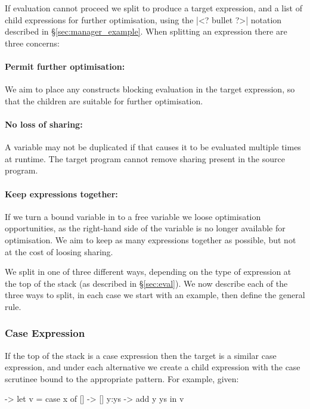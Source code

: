 \documentclass[draft]{sigplanconf}
\begin{document}
If evaluation cannot proceed we split to produce a target expression, and a list of child expressions for further optimisation, using the |<? bullet ?>| notation described in \S\ref{sec:manager_example}. When splitting an expression there are three concerns:

\paragraph{Permit further optimisation:} We aim to place any constructs blocking evaluation in the target expression, so that the children are suitable for further optimisation.

\paragraph{No loss of sharing:} A variable may not be duplicated if that causes it to be evaluated multiple times at runtime. The target program cannot remove sharing present in the source program.

\paragraph{Keep expressions together:} If we turn a bound variable in to a free variable we loose optimisation opportunities, as the right-hand side of the variable is no longer available for optimisation. We aim to keep as many expressions together as possible, but not at the cost of loosing sharing.

\smallskip
We split in one of three different ways, depending on the type of expression at the top of the stack (as described in \S\ref{sec:eval}). We now describe each of the three ways to split, in each case we start with an example, then define the general rule.

\subsubsection{Case Expression}

If the top of the stack is a case expression then the target is a similar case expression, and under each alternative we create a child expression with the case scrutinee bound to the appropriate pattern. For example, given:

\begin{code}
\x ->  let   v = case  x of
                       []    -> []
                       y:ys  -> add y ys
       in    v
\end{code}
\end{document}
